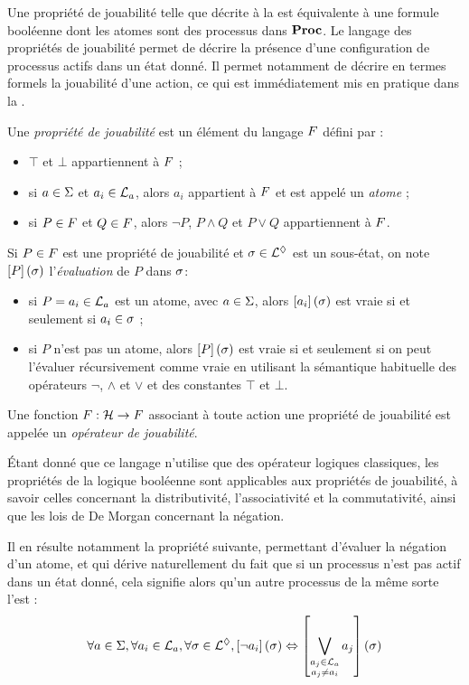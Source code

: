 Une propriété de jouabilité telle que décrite à la 
est équivalente à une formule booléenne dont les atomes sont des processus dans $\mathbf{Proc}$.
Le langage des propriétés de jouabilité permet de décrire la présence d'une configuration
de processus actifs dans un état donné.
Il permet notamment de décrire en termes formels la jouabilité d'une action,
ce qui est immédiatement mis en pratique dans la .

\begin{definition}
  \label{def:ppl}
  Une \emph{propriété de jouabilité} est un élément du langage $F$ défini  par :
  \begin{itemize}
    \item $\top$ et $\bot$ appartiennent à $F$ ;
    \item si $a \in \Sigma$ et $a_i \in \mathcal{L}_a$, alors $a_i$ appartient à $F$
      et est appelé un \emph{atome} ;
    \item si $P \in F$ et $Q \in F$,
      alors $\neg P$, $P \wedge Q$ et $P \vee Q$ appartiennent à $F$.
  \end{itemize}
%
  Si $P \in F$ est une propriété de jouabilité et $\sigma \in \mathcal{L}^\lozenge$ est un sous-état,
  on note $\left[P\right](\sigma)$ l'\emph{évaluation} de $P$ dans $\sigma$:
  \begin{itemize}
    \item si $P = a_i \in \mathcal{L}_a$ est un atome, avec $a \in \Sigma$,
      alors $\left[a_i\right](\sigma)$ est vraie si et seulement si $a_i \in \sigma$ ;
    \item si $P$ n'est pas un atome, alors $\left[P\right](\sigma)$ est vraie si et seulement si
      on peut l'évaluer récursivement comme vraie en utilisant la sémantique habituelle des
      opérateurs $\neg$, $\wedge$ et $\vee$ et des constantes $\top$ et $\bot$.
  \end{itemize}
%
  Une fonction $F : \mathcal{H} \rightarrow F$ associant à toute action une propriété de jouabilité
  est appelée un \emph{opérateur de jouabilité}.
\end{definition}

Étant donné que ce langage n'utilise que des opérateur logiques classiques,
les propriétés de la logique booléenne sont applicables aux propriétés de jouabilité,
à savoir celles concernant la distributivité, l'associativité et la commutativité,
ainsi que les lois de De Morgan concernant la négation.

Il en résulte notamment la propriété suivante, permettant d'évaluer la négation d'un atome,
et qui dérive naturellement du fait que si un processus n'est pas actif dans un état donné,
cela signifie alors qu'un autre processus de la même sorte l'est :
\[\forall a \in \Sigma, \forall a_i \in \mathcal{L}_a, \forall \sigma \in \mathcal{L}^\lozenge,
  \left[\neg a_i\right](\sigma) \Leftrightarrow
  \left[\bigvee_{\substack{a_j \in \mathcal{L}_a\\a_j \neq a_i}} a_j\right](\sigma)\]

